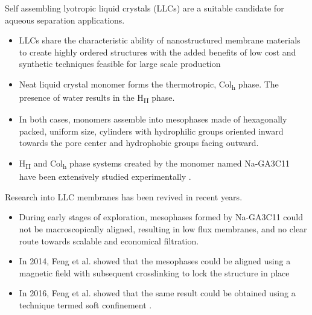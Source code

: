 \documentclass{article}
\begin{document}
  Self assembling lyotropic liquid crystals (LLCs) are a suitable candidate for
  aqueous separation applications. 
  \begin{itemize}
    \item LLCs share the characteristic ability of nanostructured membrane
    materials to create highly ordered structures with the added benefits
    of low cost and synthetic techniques feasible for 
    large scale production \cite{feng_scalable_2014}
    \item Neat liquid crystal monomer forms the thermotropic, Col\textsubscript{h}
    phase. The presence of water results in the H\textsubscript{II} phase.
    \item In both cases, monomers assemble into mesophases made of hexagonally
    packed, uniform size, cylinders with hydrophilic groups oriented inward
    towards the pore center and hydrophobic groups facing outward.
    \item H\textsubscript{II} and Col\textsubscript{h} phase systems created by
    the monomer named Na-GA3C11 have been extensively studied experimentally \cite{smith_ordered_1997, %
    zhou_supported_2005,resel_h2-phase_2000,feng_scalable_2014,feng_thin_2016}. 
  \end{itemize}
 
  Research into LLC membranes has been revived in recent years.
  \begin{itemize}
    \item During early stages of exploration, mesophases formed by Na-GA3C11 could not be macroscopically
    aligned, resulting in low flux membranes, and no clear route towards 
    scalable and economical filtration. 
    \item In 2014, Feng et al. showed that the mesophases could be aligned 
    using a magnetic field with subsequent crosslinking to lock the structure
    in place \cite{feng_scalable_2014}
    \item In 2016, Feng et al. showed that the same result could be obtained 
    using a technique termed soft confinement \cite{feng_thin_2016}.
  \end{itemize}
 
\end{document}
